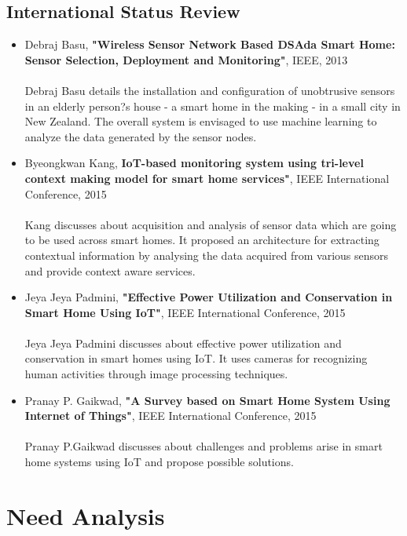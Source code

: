         	\subsection{International Status Review}
        	\begin{itemize}
        		\item Debraj Basu, \textbf{"Wireless Sensor Network Based DSAda Smart Home: Sensor Selection, Deployment and Monitoring"}, IEEE, 2013\\ \\
        		Debraj Basu details the installation and configuration of unobtrusive sensors in an elderly person?s house - a smart home in the making - in a small city in New Zealand. The overall system is envisaged to use machine learning to analyze the data generated by the sensor nodes.
        		\item Byeongkwan Kang, \textbf{IoT-based monitoring system using tri-level context making model for smart home services"}, IEEE International Conference, 2015\\ \\
        		Kang discusses about acquisition and analysis of sensor data which are going to be used across smart homes. It proposed an architecture for extracting contextual information by analysing the data acquired from various sensors and provide context aware services.
        		\item Jeya Jeya Padmini, \textbf{"Effective Power Utilization and Conservation in Smart Home Using IoT"}, IEEE International Conference, 2015\\ \\
        		Jeya Jeya Padmini discusses about effective power utilization and conservation in smart homes using IoT. It uses cameras for recognizing human activities through image processing techniques.
        		\item Pranay P. Gaikwad, \textbf{"A Survey based on Smart Home System Using Internet of Things"}, IEEE International Conference, 2015\\ \\
        		Pranay P.Gaikwad discusses about challenges and problems arise in smart home systems using IoT and propose possible solutions.
        	\end{itemize}
        \section{Need Analysis}
        
